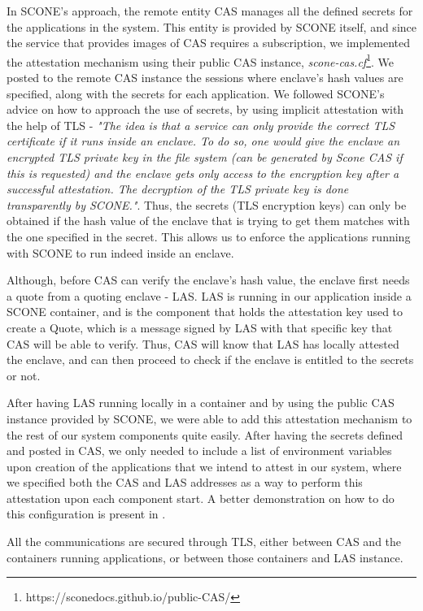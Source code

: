 In SCONE's approach, the remote entity CAS manages all the defined secrets for the applications in the system. This entity is provided by SCONE itself, and since the service that provides images of CAS requires a subscription, we implemented the attestation mechanism using their public CAS instance, \textit{scone-cas.cf}\footnote{https://sconedocs.github.io/public-CAS/}.
We posted to the remote CAS instance the sessions where enclave's hash values are specified, along with the secrets for each application. We followed SCONE's advice on how to approach the use of secrets, by using implicit attestation with the help of TLS - \textit{"The idea is that a service can only provide the correct TLS certificate if it runs inside an enclave. To do so, one would give the enclave an encrypted TLS private key in the file system (can be generated by Scone CAS if this is requested) and the enclave gets only access to the encryption key after a successful attestation. The decryption of the TLS private key is done transparently by SCONE."}.
Thus, the secrets (TLS encryption keys) can only be obtained if the hash value of the enclave that is trying to get them matches with the one specified in the secret. This allows us to enforce the applications running with SCONE to run indeed inside an enclave. 

Although, before CAS can verify the enclave's hash value, the enclave first needs a quote from a quoting enclave - LAS. LAS is running in our application inside a SCONE container, and is the component that holds the attestation key used to create a Quote, which is a message signed by LAS with that specific key that CAS will be able to verify. Thus, CAS will know that LAS has locally attested the enclave, and can then proceed to check if the enclave is entitled to the secrets or not. 

After having LAS running locally in a container and by using the public CAS instance provided by SCONE, we were able to add this attestation mechanism to the rest of our system components quite easily. After having the secrets defined and posted in CAS, we only needed to include a list of environment variables upon creation of the applications that we intend to attest in our system, where we specified both the CAS and LAS addresses as a way to perform this attestation upon each component start. A better demonstration on how to do this configuration is present in \cite{sconeAttestationConfig}. 

All the communications are secured through TLS, either between CAS and the containers running applications, or between those containers and LAS instance. 


